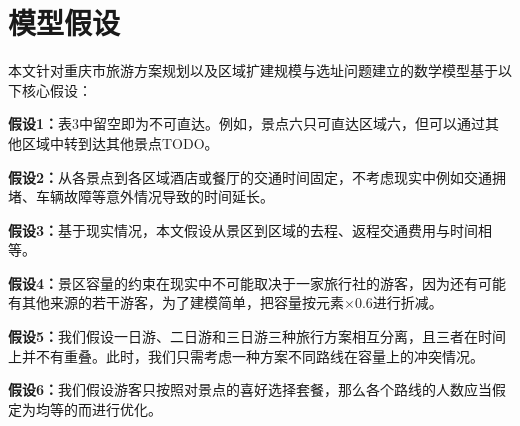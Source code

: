 \chapter[\hspace{0pt}模型假设]{{\heiti{}\hspace{0pt}模型假设}}\label{chapter2:模型假设}

\removelofgap
\removelotgap

本文针对重庆市旅游方案规划以及区域扩建规模与选址问题建立的数学模型基于以下核心假设：

\textbf{假设1：}表3中留空即为不可直达。例如，景点六只可直达区域六，但可以通过其他区域中转到达其他景点TODO。

\textbf{假设2：}从各景点到各区域酒店或餐厅的交通时间固定，不考虑现实中例如交通拥堵、车辆故障等意外情况导致的时间延长。

\textbf{假设3：}基于现实情况，本文假设从景区到区域的去程、返程交通费用与时间相等。

\textbf{假设4：}景区容量的约束在现实中不可能取决于一家旅行社的游客，因为还有可能有其他来源的若干游客，为了建模简单，把容量按元素$\times 0.6$进行折减。

\textbf{假设5：}我们假设一日游、二日游和三日游三种旅行方案相互分离，且三者在时间上并不有重叠。此时，我们只需考虑一种方案不同路线在容量上的冲突情况。

\textbf{假设6：}我们假设游客只按照对景点的喜好选择套餐，那么各个路线的人数应当假定为均等的而进行优化。